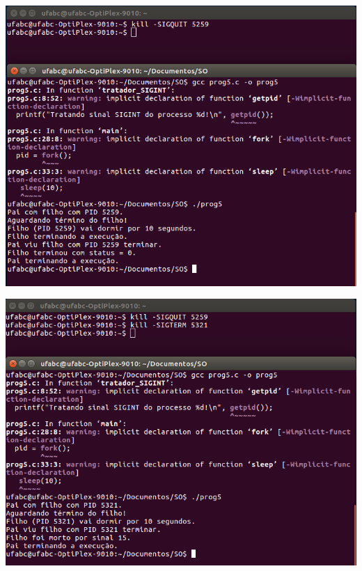 \vspace{2em}
\begin{minipage}{\textwidth}
    \hspace{-1em}
    \centering
    \begin{minipage}[b]{0.49\textwidth}
        \centering
        \includegraphics[scale=.3]{pratica1/prog5kill1.png}
        \label{prog5kill1png}
    \end{minipage}
    \hfill
    \begin{minipage}[b]{0.49\textwidth}
        \centering
        \includegraphics[scale=.3]{pratica1/prog5kill2.png}
        \label{prog5kill2png}
    \end{minipage}
    \hspace{1em}
\end{minipage}

